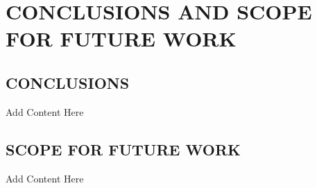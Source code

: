 \chapter{\texorpdfstring{{}\centering \textbf{\MakeUppercase{Conclusions and Scope for Future Work }}}{Conclusions and Scope for Future Work}}
\justifying

\section{\textbf{\MakeUppercase{Conclusions}}}
Add Content Here
\vspace{2.0pt}\\
\section{\textbf{\MakeUppercase{Scope for Future Work}}}
Add Content Here